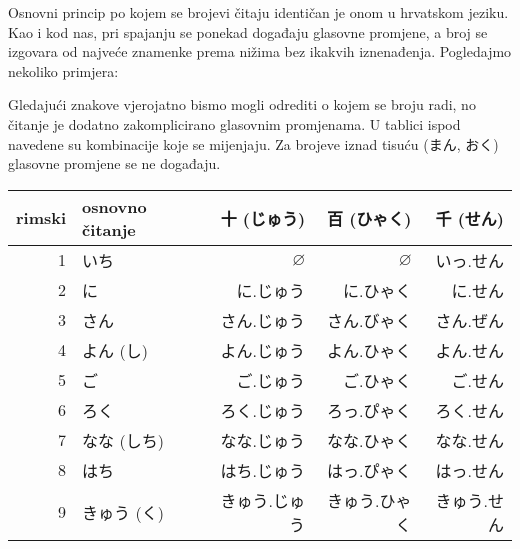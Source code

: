 	\newpage
	
	Osnovni princip po kojem se brojevi čitaju identičan je onom u hrvatskom jeziku. Kao i kod nas, pri spajanju se ponekad događaju glasovne promjene, a broj se izgovara od najveće znamenke prema nižima bez ikakvih iznenađenja. Pogledajmo nekoliko primjera:
	
	\begin{reibun}
	\end{reibun}

	Gledajući znakove vjerojatno bismo mogli odrediti o kojem se broju radi, no čitanje je dodatno zakomplicirano glasovnim promjenama. U tablici ispod navedene su kombinacije koje se mijenjaju. Za brojeve iznad tisuću (まん, おく) glasovne promjene se ne događaju.
	
	\vspace{5pt}
	\begin{table}[h]
		\centering
		\begin{tabular}{r l r r r}\toprule[2pt]
			rimski & osnovno čitanje & 十 (じゅう) & 百 (ひゃく) & 千 (せん)\\
			\midrule
			1			& いち & $\varnothing$ & $\varnothing$ & \colorbox{blue!10}{いっ.せん} \\
			2			& に & に.じゅう & に.ひゃく & に.せん \\
			3			& さん & さん.じゅう & \colorbox{blue!10}{さん.びゃく} & \colorbox{blue!10}{さん.ぜん} \\
			4			& よん (し\footnotemark[1]) & よん.じゅう & よん.ひゃく & よん.せん \\
			5			& ご & ご.じゅう & ご.ひゃく & ご.せん \\
			6			& ろく & ろく.じゅう & \colorbox{blue!10}{ろっ.ぴゃく} & ろく.せん \\
			7			& なな (しち\footnotemark[1]) & なな.じゅう & なな.ひゃく & なな.せん \\
			8			& はち & はち.じゅう & \colorbox{blue!10}{はっ.ぴゃく} & \colorbox{blue!10}{はっ.せん} \\
			9			& きゅう (く\footnotemark[1]) & きゅう.じゅう & きゅう.ひゃく & きゅう.せん \\
			\bottomrule
		\end{tabular}
	\end{table}



